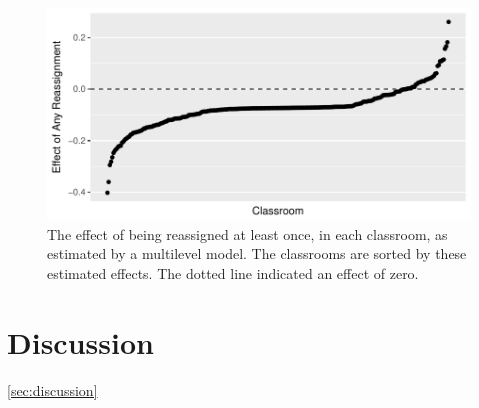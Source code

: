 \documentclass[12pt]{article}\usepackage[]{graphicx}\usepackage[]{color}
\makeatletter
\def\maxwidth{ %
  \ifdim\Gin@nat@width>\linewidth
    \linewidth
  \else
    \Gin@nat@width
  \fi
}
\makeatother
\begin{document}
\begin{figure}
  \centering

\includegraphics[width=\maxwidth]{figure/hetroPlot-1} 

\caption{The effect of being reassigned at least once, in each
  classroom, as estimated by a multilevel model. The classrooms are
  sorted by these estimated effects. The dotted line indicated an
  effect of zero.}
\label{fig:trtHet}
\end{figure}




\section{Discussion}\ref{sec:discussion}




\end{document}
